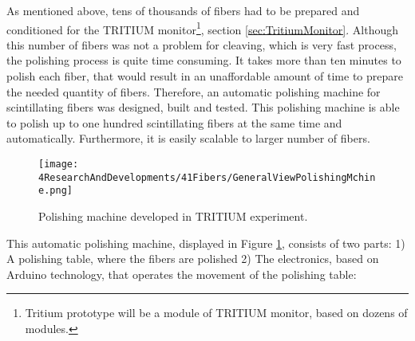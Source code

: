 As mentioned above, tens of thousands of fibers had to be prepared and conditioned for the TRITIUM monitor\footnote{Tritium prototype will be a module of TRITIUM monitor, based on dozens of modules.}, section \ref{sec:TritiumMonitor}. Although this number of fibers was not a problem for cleaving, which is very fast process, the polishing process is quite time consuming. It takes more than ten minutes to polish each fiber, that would result in an unaffordable amount of time to prepare the needed quantity of fibers. Therefore, an automatic polishing machine for scintillating fibers was designed, built and tested. This polishing machine is able to polish up to one hundred scintillating fibers at the same time and automatically. Furthermore, it is easily scalable to larger number of fibers.

\begin{figure}[h]
\centering
\texttt{[image: 4ResearchAndDevelopments/41Fibers/GeneralViewPolishingMchine.png]}
\caption{Polishing machine developed in TRITIUM experiment.\label{fig:GeneralViewPolishingMachine}}
\end{figure}
This automatic polishing machine, displayed in Figure \ref{fig:GeneralViewPolishingMachine}, consists of two parts: 1) A polishing table, where the fibers are polished 2) The electronics, based on Arduino technology, that operates the movement of the polishing table:

